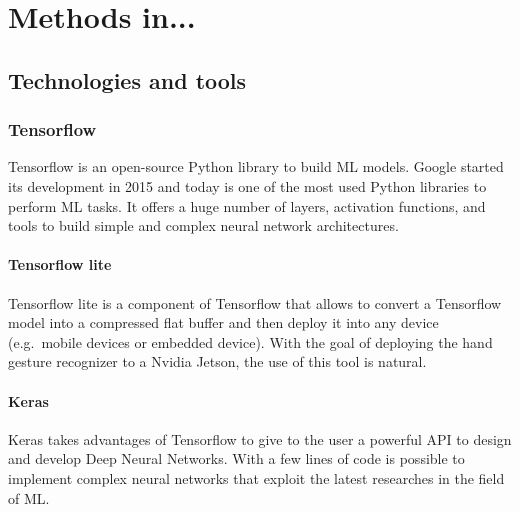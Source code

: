 \documentclass[../thesis.tex]{subfiles}
\begin{document}
\chapter{Methods in...}\label{cap:methods}
\section{Technologies and tools}\label{sec:technologies_and_tolls}
\subsection{Tensorflow}
Tensorflow is an open-source Python library to build \acrshort{ML} models. Google started its development in 2015 and today is one of the most used Python libraries to perform \acrshort{ML} tasks. It offers a huge number of layers, activation functions, and tools to build simple and complex neural network architectures.

\subsubsection{Tensorflow lite}
Tensorflow lite is a component of Tensorflow that allows to convert a Tensorflow model into a compressed flat buffer and then deploy it into any device (e.g.\ mobile devices or embedded device). With the goal of deploying the hand gesture recognizer to a Nvidia Jetson, the use of this tool is natural.

\subsubsection{Keras}
Keras takes advantages of Tensorflow to give to the user a powerful API to design and develop Deep Neural Networks. With a few lines of code is possible to implement complex neural networks that exploit the latest researches in the field of \gls{ML}.
\end{document}
